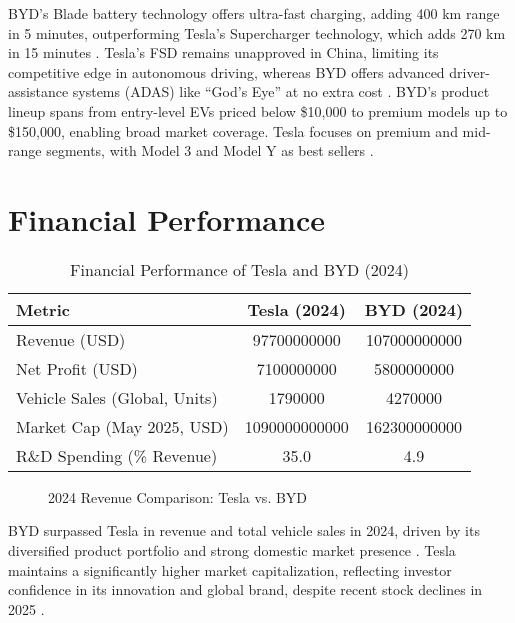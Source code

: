 \documentclass{article}
\begin{document}
BYD's Blade battery technology offers ultra-fast charging, adding 400 km range in 5 minutes, outperforming Tesla's Supercharger technology, which adds 270 km in 15 minutes \citep{cnn2025,investors2024}. Tesla's FSD remains unapproved in China, limiting its competitive edge in autonomous driving, whereas BYD offers advanced driver-assistance systems (ADAS) like ``God's Eye'' at no extra cost \citep{cnn2025}. BYD's product lineup spans from entry-level EVs priced below \$10,000 to premium models up to \$150,000, enabling broad market coverage. Tesla focuses on premium and mid-range segments, with Model 3 and Model Y as best sellers \citep{investors2024,aeternus2024}.

\section{Financial Performance}

\begin{table}[ht]
\centering
\caption{Financial Performance of Tesla and BYD (2024)}
\label{tab:financials}
\begin{tabularx}{\textwidth}{l S[table-format=7.1] S[table-format=7.1]}
\toprule
Metric & {Tesla (2024)} & {BYD (2024)} \\
\midrule
Revenue (USD) & 97700000000 & 107000000000 \\
Net Profit (USD) & 7100000000 & 5800000000 \\
Vehicle Sales (Global, Units) & 1790000 & 4270000 \\
Market Cap (May 2025, USD) & 1090000000000 & 162300000000 \\
R\&D Spending (\% Revenue) & 35.0 & 4.9 \\
\bottomrule
\end{tabularx}
\end{table}

\begin{figure}[ht]
\centering
{}
\caption{2024 Revenue Comparison: Tesla vs. BYD}
\label{fig:revenue}
\end{figure}

BYD surpassed Tesla in revenue and total vehicle sales in 2024, driven by its diversified product portfolio and strong domestic market presence \citep{cnn2025,investors2024}. Tesla maintains a significantly higher market capitalization, reflecting investor confidence in its innovation and global brand, despite recent stock declines in 2025 \citep{investors2024}.
\end{document}
